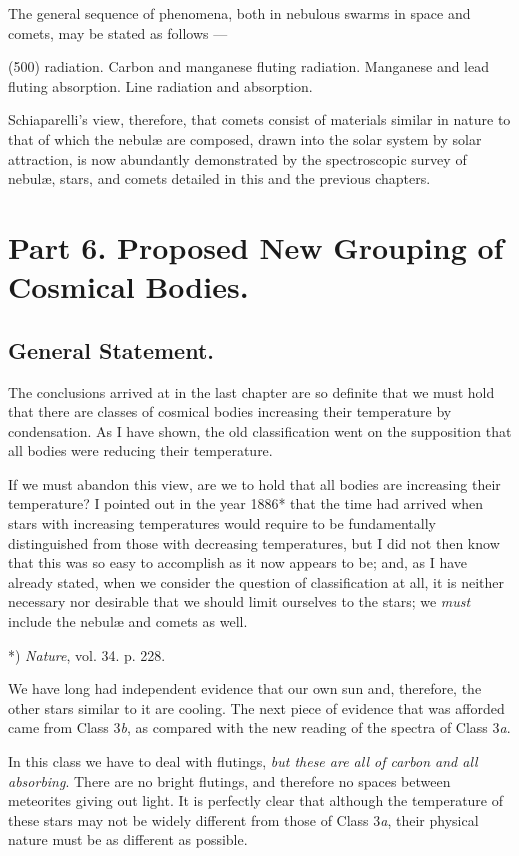 \documentclass[a4paper, 12pt, oneside, polutonikogreek, english]{article}
\begin{document}
The general sequence of phenomena, both in nebulous swarms in space and comets, may be stated as follows ---

(500) radiation. 
Carbon and manganese fluting radiation. 
Manganese and lead fluting absorption. 
Line radiation and absorption. 

Schiaparelli's view, therefore, that comets consist of materials similar in nature to that of which the nebulæ are composed, drawn into the solar system by solar attraction, is now abundantly demonstrated by the spectroscopic survey of nebulæ, stars, and comets detailed in this and the previous chapters.

\section{Part 6. Proposed New Grouping of Cosmical Bodies.}

\subsection{General Statement.}

The conclusions arrived at in the last chapter are so definite that we must hold that there are classes of cosmical bodies increasing their temperature by condensation. As I have shown, the old classification went on the supposition that all bodies were reducing their temperature.

If we must abandon this view, are we to hold that all bodies are increasing their temperature? I pointed out in the year 1886* that the time had arrived when stars with increasing temperatures would require to be fundamentally distinguished from those with decreasing temperatures, but I did not then know that this was so easy to accomplish as it now appears to be; and, as I have already stated, when we consider the question of classification at all, it is neither necessary nor desirable that we should limit ourselves to the stars; we \emph{must} include the nebulæ and comets as well.

*) \emph{Nature}, vol. 34. p. 228.

We have long had independent evidence that our own sun and, therefore, the other stars similar to it are cooling. The next piece of evidence that was afforded came from Class 3\emph{b}, as compared with the new reading of the spectra of Class 3\emph{a}.

In this class we have to deal with flutings, \emph{but these are all of carbon and all absorbing}. There are no bright flutings, and therefore no spaces between meteorites giving out light. It is perfectly clear that although the temperature of these stars may not be widely different from those of Class 3\emph{a}, their physical nature must be as different as possible.
\end{document}
